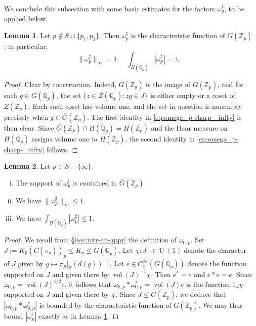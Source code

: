 \documentclass[reqno]{amsart}
\DeclareMathOperator{\U}{U}
\DeclareMathOperator{\vol}{vol}
\theoremstyle{plain} \newtheorem{theorem} {Theorem}
\theoremstyle{definition} \newtheorem{definition} [theorem] {Definition}
\theoremstyle{itplain} %
\newtheorem{lemma}[theorem]{Lemma}
\numberwithin{equation}{section}
\numberwithin{theorem}{section}
\renewcommand{\leq}{\leqslant}
\begin{document}
We conclude this subsection with some basic estimates for the factors $\omega_\mathfrak{p} ^\sharp$, to be applied below.
\begin{lemma}\label{lem:let-p-notin}
  Let $p \notin S \cup \{p_1, p_2\}$.  Then $\omega_p ^\sharp$ is the characteristic function of $\bar{G}(\mathbb{Z}_p)$; in particular,
  \begin{equation}\label{eq:omega_p-sharp-_infty}
    \|\omega_p ^\sharp \|_{\infty} = 1, \quad \int _{H(\mathbb{Q}_p)} |\omega_p ^\sharp| = 1.
  \end{equation}
\end{lemma}
\begin{proof}
  Clear by construction.  Indeed, $\bar{G}(\mathbb{Z}_p)$ is the image of $G(\mathbb{Z}_p)$, and for each $g \in G(\mathbb{Q}_p)$, the set $\{z \in Z(\mathbb{Q}_p) : z g \in J\}$ is either empty or a coset of $Z(\mathbb{Z}_p)$.  Each such coset has volume one, and the set in question is nonempty precisely when $g \in \bar{G}(\mathbb{Z}_p)$.  The first identity in \eqref{eq:omega_p-sharp-_infty} is then clear.  Since $\bar{G}(\mathbb{Z}_p) \cap H(\mathbb{Q}_p) = H(\mathbb{Z}_p)$ and the Haar measure on $H(\mathbb{Q}_p)$ assigns volume one to $H(\mathbb{Z}_p)$, the second identity in \eqref{eq:omega_p-sharp-_infty} follows.
\end{proof}
\begin{lemma}\label{lem:self-conv-omeg}
  Let $p \in S - \{\infty \}$.
  \begin{enumerate}[(i)]
  \item \label{item:self-conv-omeg-2}  The support of $\omega_p ^\sharp$ is contained in $\bar{G}(\mathbb{Z}_p)$.
  \item \label{item:self-conv-omeg-1} We have $\|\omega_{p} ^\sharp\|_{\infty} \leq 1$.
  \item \label{item:self-conv-omeg-3}  We have $\int _{H(\mathbb{Q}_p)} |\omega_p ^\sharp| \leq 1$.
  \end{enumerate}
\end{lemma}
\begin{proof}
  We recall from \S\ref{sec:intr-an-appr} the definition of $\omega_{0,p}$.  Set $J := K_0(C(\pi_p))_p \leq K_p \leq G(\mathbb{Q}_p)$.  Let $\chi : J \rightarrow \U(1)$ denote the character of $J$ given by $g \mapsto \pi_p|_{Z}(d(g))^{-1}$.  Let $e \in C_c^\infty(G(\mathbb{Q}_p))$ denote the function supported on $J$ and given there by $\vol(J)^{-1} \chi$.  Then $e^* = e$ and $e \ast e = e$.  Since $\omega_{0,p} = \vol(J)^{1/2} e$, it follows that $\omega_{0,p} \ast \omega_{0,p}^* = \vol(J) e$ is the function $1_J \chi$ supported on $J$ and given there by $\chi$.  Since $J \leq G(\mathbb{Z}_p)$, we deduce that $|\omega_{0,p} \ast \omega_{0,p}^*|$ is bounded by the characteristic function of $G(\mathbb{Z}_p)$.  We may thus bound $|\omega_p ^\sharp|$ exactly as in Lemma \ref{lem:let-p-notin}. 
\end{proof}
\end{document}
